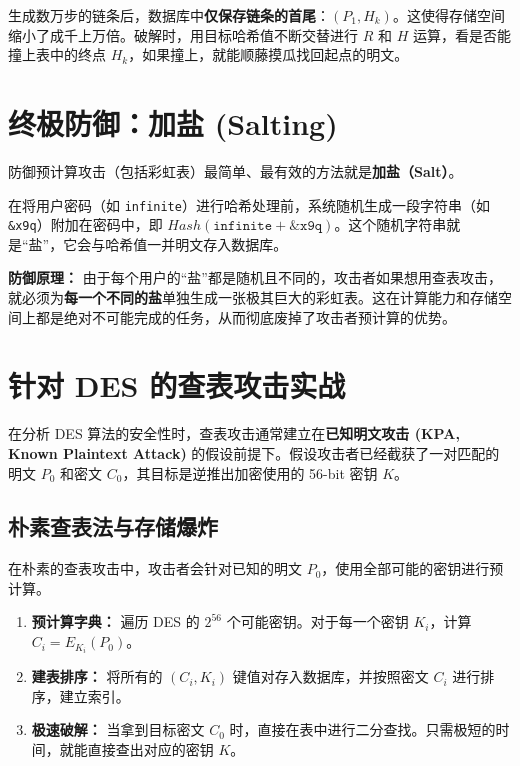 \documentclass[12pt,a4paper]{article}
\begin{document}
生成数万步的链条后，数据库中\textbf{仅保存链条的首尾}：$(P_1, H_k)$。这使得存储空间缩小了成千上万倍。破解时，用目标哈希值不断交替进行 $R$ 和 $H$ 运算，看是否能撞上表中的终点 $H_k$，如果撞上，就能顺藤摸瓜找回起点的明文。

\section{终极防御：加盐 (Salting)}
防御预计算攻击（包括彩虹表）最简单、最有效的方法就是\textbf{加盐（Salt）}。

\begin{coreconcept}[加盐机制]
在将用户密码（如 \texttt{infinite}）进行哈希处理前，系统随机生成一段字符串（如 \texttt{\&x9q}）附加在密码中，即 $Hash(\texttt{infinite} + \texttt{\&x9q})$。这个随机字符串就是“盐”，它会与哈希值一并明文存入数据库。
\end{coreconcept}

\textbf{防御原理：} 由于每个用户的“盐”都是随机且不同的，攻击者如果想用查表攻击，就必须为\textbf{每一个不同的盐}单独生成一张极其巨大的彩虹表。这在计算能力和存储空间上都是绝对不可能完成的任务，从而彻底废掉了攻击者预计算的优势。
\section{针对 DES 的查表攻击实战}
在分析 DES 算法的安全性时，查表攻击通常建立在\textbf{已知明文攻击 (KPA, Known Plaintext Attack)} 的假设前提下。假设攻击者已经截获了一对匹配的明文 $P_0$ 和密文 $C_0$，其目标是逆推出加密使用的 56-bit 密钥 $K$。

\subsection{朴素查表法与存储爆炸}
在朴素的查表攻击中，攻击者会针对已知的明文 $P_0$，使用全部可能的密钥进行预计算。

\begin{enumerate}[label=\textbf{Step \arabic*.}, itemsep=5pt]
    \item \textbf{预计算字典：} 遍历 DES 的 $2^{56}$ 个可能密钥。对于每一个密钥 $K_i$，计算 $C_i = E_{K_i}(P_0)$。
    \item \textbf{建表排序：} 将所有的 $(C_i, K_i)$ 键值对存入数据库，并按照密文 $C_i$ 进行排序，建立索引。
    \item \textbf{极速破解：} 当拿到目标密文 $C_0$ 时，直接在表中进行二分查找。只需极短的时间，就能直接查出对应的密钥 $K$。
\end{enumerate}
\end{document}
